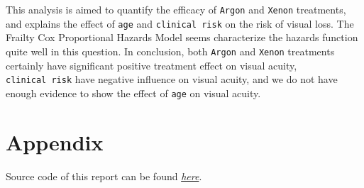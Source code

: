 \documentclass[
]{article}
\begin{document}
This analysis is aimed to quantify the efficacy of \texttt{Argon} and
\texttt{Xenon} treatments, and explains the effect of \texttt{age} and
\texttt{clinical\ risk} on the risk of visual loss. The Frailty Cox
Proportional Hazards Model seems characterize the hazards function quite
well in this question. In conclusion, both \texttt{Argon} and
\texttt{Xenon} treatments certainly have significant positive treatment
effect on visual acuity, \texttt{clinical\ risk} have negative influence
on visual acuity, and we do not have enough evidence to show the effect
of \texttt{age} on visual acuity.

\hypertarget{appendix}{%
\section{Appendix}\label{appendix}}

Source code of this report can be found
\href{https://github.com/ZhihaoXu/Stats504/blob/main/Assignment/assignment_2/stats504_hw2.Rmd}{\emph{here}}.
\end{document}
